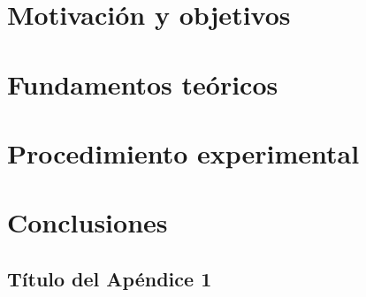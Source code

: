 \documentclass[spanish,a4paper,11pt,twoside]{report}
\begin{document}
\newpage{\pagestyle{empty}\cleardoublepage}


\newpage{\pagestyle{empty}\cleardoublepage}

\renewcommand{\thepage}{\arabic{page}}
\setcounter{page}{1}

\setlength{\parindent}{5mm}

\chapter{Motivación y objetivos}
\label{chapter:obj}


\chapter{Fundamentos teóricos}
\label{chapter:teo}


\chapter{Procedimiento experimental}
\label{chapter:exp}



\chapter{Conclusiones}
\label{chapter:conclusiones}




\newpage{\pagestyle{empty}\cleardoublepage}
\thispagestyle{empty}
\begin{appendix}

\chapter{Título del Apéndice 1}
\label{appendix:1}




\end{appendix}





\nocite{*}
\end{document}
